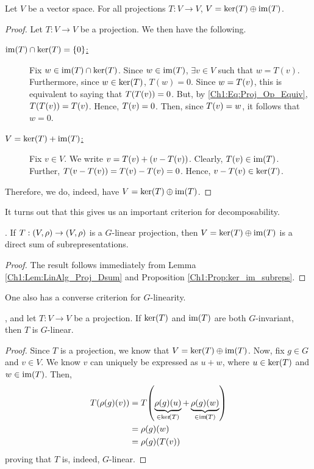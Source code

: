 \begin{lemma} \label{Ch1:Lem:LinAlg_Proj_Dsum}
    Let $V$ be a vector space. For all projections $T : V \to V$, $V = \operatorname{ker}\!\left( T \right) \oplus \operatorname{im}\!\left( T \right)$.
\end{lemma}
\begin{proof}
    Let $T : V \to V$ be a projection. We then have the following.
    \begin{description}
        \item[\underline{$\operatorname{im}\!\left( T \right) \cap \operatorname{ker}\!\left( T \right) = \left\{ 0 \right\}$:}] Fix $w \in \operatorname{im}\!\left( T \right) \cap \operatorname{ker}\!\left( T \right)$. Since $w \in \operatorname{im}\!\left( T \right)$, $\exists v \in V$ such that $w = T(v)$. Furthermore, since $w \in \operatorname{ker}\!\left( T \right)$, $T(w) = 0$. Since $w = T\!\left( v \right)$, this is equivalent to saying that $T\!\left( T\!\left( v \right) \right) = 0$. But, by \eqref{Ch1:Eq:Proj_Op_Equiv}, $T\!\left( T\!\left( v \right) \right) = T\!\left( v \right)$. Hence, $T\!\left( v \right) = 0$. Then, since $T\!\left( v \right) = w$, it follows that $w = 0$.
        \item[\underline{$V = \operatorname{ker}\!\left( T \right) + \operatorname{im}\!\left( T \right)$:}] Fix $v \in V$. We write $v = T\!\left( v \right) + \left( v - T\!\left( v \right) \right)$. Clearly, $T\!\left( v \right) \in \operatorname{im}\!\left( T \right)$. Further, $T\!\left( v - T\!\left( v \right) \right) = T\!\left( v \right) - T\!\left( v \right) = 0$. Hence, $v - T\!\left( v \right) \in \operatorname{ker}\!\left( T \right)$.
    \end{description}
    Therefore, we do, indeed, have $V = \operatorname{ker}\!\left( T \right) \oplus \operatorname{im}\!\left( T \right)$.
\end{proof}

It turns out that this gives us an important criterion for decomposability.

\begin{corollary}\label{Ch1:Cor:G_lin_proj_ker_im}
    . If $T : \left( V, \rho \right) \to \left( V, \rho \right)$ is a $G$-linear projection, then $V = \operatorname{ker}\!\left( T \right) \oplus \operatorname{im}\!\left( T \right)$ is a direct sum of subrepresentations.
\end{corollary}
\begin{proof}
    The result follows immediately from Lemma \ref{Ch1:Lem:LinAlg_Proj_Dsum} and Proposition \ref{Ch1:Prop:ker_im_subreps}.
\end{proof}

One also has a converse criterion for $G$-linearity.

\begin{proposition} \label{Ch1:Prop:Proj_Inv_Lin}
    , and let $T : V \to V$ be a projection. If $\operatorname{ker}\!\left( T \right)$ and $\operatorname{im}\!\left( T \right)$ are both $G$-invariant, then $T$ is $G$-linear.
\end{proposition}
\begin{proof}
    Since $T$ is a projection, we know that $V = \operatorname{ker}\!\left( T \right) \oplus \operatorname{im}\!\left( T \right)$. Now, fix $g \in G$ and $v \in V$. We know $v$ can uniquely be expressed as $u + w$, where $u \in \operatorname{ker}\!\left( T \right)$ and $w \in \operatorname{im}\!\left( T \right)$. Then,
    \begin{align*}
        T\!\left( \rho(g)(v) \right) &= T\!\left( \underbrace{\rho(g)(u)}_{\in \operatorname{ker}\!\left( T \right)} + \underbrace{\rho(g)(w)}_{\in \operatorname{im}\!\left( T \right)} \right) \\
        &= \rho(g)(w) \\
        &= \rho(g)\!\left( T\!\left( v \right) \right)
    \end{align*}
    proving that $T$ is, indeed, $G$-linear.
\end{proof}

